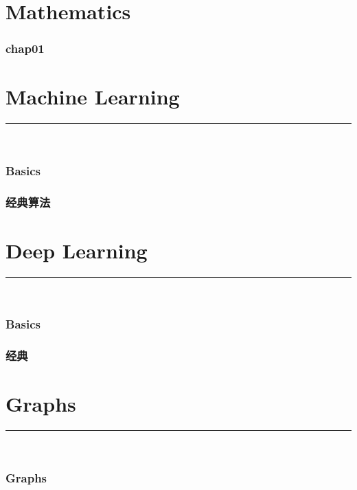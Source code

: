 \documentclass{article}
\begin{document}
% 
\part{Mathematics}
\section{chap01}



\clearpage
\part{Machine Learning}
{\noindent}	 \rule[-10pt]{17.5cm}{0.5em}\\  %
\section{Basics}

\section{经典算法}



\clearpage
\part{Deep Learning}
{\noindent}	 \rule[-10pt]{17.5cm}{0.5em}\\ 
\section{Basics}


\section{经典}



\clearpage
\part{Graphs}
{\noindent}	 \rule[-10pt]{17.5cm}{0.5em}\\
\section{Graphs}

\end{document}
